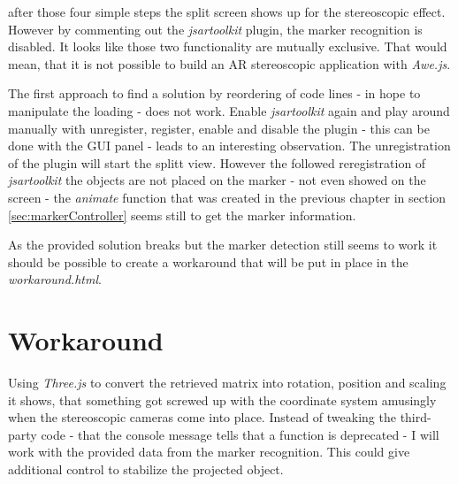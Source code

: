 after those four simple steps  the split screen shows up for the stereoscopic effect. However by commenting out the \textit{jsartoolkit} plugin, the marker recognition is disabled. It looks like those two functionality are mutually exclusive. That would mean, that it is not possible to build an AR stereoscopic application with \textit{Awe.js}.

The first approach to find a solution by reordering of code lines - in hope to manipulate the loading - does not work. 
Enable \textit{jsartoolkit} again and play around manually with unregister, register, enable and disable the plugin - this can be done with the GUI panel - leads to an interesting observation. The unregistration of the plugin will start the splitt view. However the followed reregistration of \textit{jsartoolkit} the objects are not placed on the marker - not even showed on the screen - the \textit{animate} function that was created in the previous chapter in section \ref{sec:markerController} seems still to get the marker information.

As the provided solution breaks but the marker detection still seems to work it should be possible to create a workaround that will be put in place in the \textit{workaround.html}.

\section{Workaround}
\label{sec:workaround}

Using \textit{Three.js} to convert the retrieved matrix into rotation, position and scaling it shows, that something got screwed up with the coordinate system amusingly when the stereoscopic cameras come into place. Instead of tweaking the third-party code - that the console message tells that a function is deprecated - I will work with the provided data from the marker recognition. This could give additional control to stabilize the projected object. 

